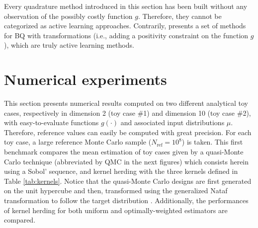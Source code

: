 \medskip
\begin{remark}
Every quadrature method introduced in this section has been built without any observation of the possibly costly function $g$. 
Therefore, they cannot be categorized as active learning approaches. 
Contrarily, \cite{motonobu_2019} presents a set of methods for BQ with transformations (i.e., adding a positivity constraint on the function $g$), which are truly active learning methods. 
\end{remark}




\section{Numerical experiments}\label{sec:sec44}
This section presents numerical results computed on two different analytical toy cases, respectively in dimension 2 (toy case \#1) and dimension 10 (toy case \#2), with easy-to-evaluate functions $g(\cdot)$ and associated input distributions $\mu$. 
Therefore, reference values can easily be computed with great precision. 
For each toy case, a large reference Monte Carlo sample ($N_{\mathrm{ref}} = 10^8$) is taken. 
This first benchmark compares the mean estimation of toy cases given by a quasi-Monte Carlo technique (abbreviated by QMC in the next figures) which consists herein using a Sobol' sequence, and kernel herding with the three kernels defined in Table \ref{tab:kernels}. 
Notice that the quasi-Monte Carlo designs are first generated on the unit hypercube and then, transformed using the generalized Nataf transformation to follow the target distribution \citep{lebrun_2009}. 
Additionally, the performances of kernel herding for both uniform and optimally-weighted  estimators are compared.



